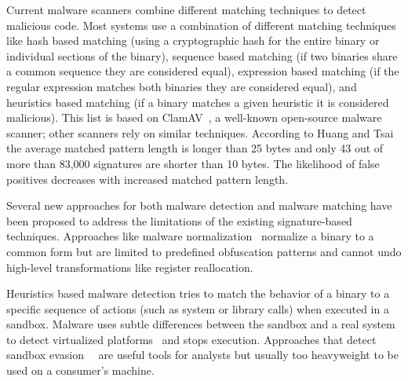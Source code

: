 \documentclass[letterpaper,twocolumn,10pt]{article}
\begin{document}
Current malware scanners combine different matching techniques to detect
malicious code. Most systems use a combination of different matching
techniques like hash based matching (using a cryptographic hash for the entire
binary or individual sections of the binary), sequence based matching (if two
binaries share a common sequence they are considered equal), expression based
matching (if the regular expression matches both binaries they are considered
equal), and heuristics based matching (if a binary matches a given heuristic it
is considered malicious). This list is based on ClamAV~\cite{clamav}, a
well-known open-source malware scanner; other scanners rely on similar
techniques.  According to Huang and Tsai~\cite{huang10icc} the average matched
pattern length is longer than 25 bytes and only 43 out of more than
83,000 signatures are shorter than 10 bytes. The likelihood of false positives
decreases with increased matched pattern length.

Several new approaches for both malware detection and malware matching
have been proposed to address the limitations of the existing
signature-based techniques. Approaches like malware
normalization~\cite{christodorescu05malwarenormalization} normalize a
binary to a common form but are limited to predefined obfuscation
patterns and cannot undo high-level transformations like register
reallocation.

Heuristics based malware detection tries to match the behavior of a binary to a
specific sequence of actions (such as system or library calls) when executed in
a sandbox. Malware uses subtle differences between the sandbox and a real
system~\cite{garfinkel07hotos, chen08dsn} to detect virtualized
platforms~\cite{ferrie06symantec, paleari09woot, raffetseder07isc,
rutkowska04blog} and stops execution. Approaches that detect sandbox
evasion~~\cite{balzarotti10ndss, ferrie06symantec, johnson11sp,
kang09vmsec,kolbitsch+11,lau10cv, lindorfer11raid} are useful tools for analysts
but usually too heavyweight to be used on a consumer's machine.

\end{document}
